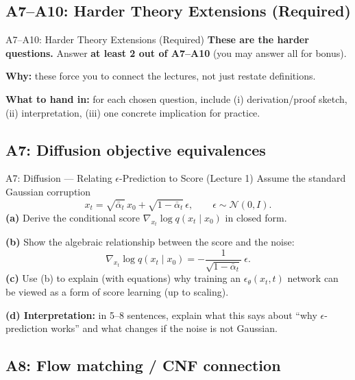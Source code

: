 \documentclass[aspectratio=169]{beamer}
\begin{document}
\subsection{A7--A10: Harder Theory Extensions (Required)}

\begin{frame}{A7--A10: Harder Theory Extensions (Required)}
\small
\textbf{These are the harder questions.} Answer \textbf{at least 2 out of A7--A10} (you may answer all for bonus).
\vspace{0.4em}

\textbf{Why:} these force you to connect the lectures, not just restate definitions.
\vspace{0.4em}

\textbf{What to hand in:} for each chosen question, include (i) derivation/proof sketch, (ii) interpretation, (iii) one concrete implication for practice.
\end{frame}

\subsection{A7: Diffusion objective equivalences}

\begin{frame}{A7: Diffusion --- Relating $\epsilon$-Prediction to Score (Lecture 1)}
\small
Assume the standard Gaussian corruption
\[
x_t = \sqrt{\bar\alpha_t}\,x_0 + \sqrt{1-\bar\alpha_t}\,\epsilon,\qquad \epsilon\sim\mathcal{N}(0,I).
\]
\textbf{(a)} Derive the conditional score $\nabla_{x_t}\log q(x_t\mid x_0)$ in closed form.
\vspace{0.3em}

\textbf{(b)} Show the algebraic relationship between the score and the noise:
\[
\nabla_{x_t}\log q(x_t\mid x_0) = -\frac{1}{\sqrt{1-\bar\alpha_t}}\ \epsilon.
\]
\textbf{(c)} Use (b) to explain (with equations) why training an $\epsilon_\theta(x_t,t)$ network can be viewed as a form of score learning (up to scaling).
\vspace{0.3em}

\textbf{(d) Interpretation:} in 5--8 sentences, explain what this says about ``why $\epsilon$-prediction works'' and what changes if the noise is not Gaussian.
\end{frame}

\subsection{A8: Flow matching / CNF connection}
\end{document}
